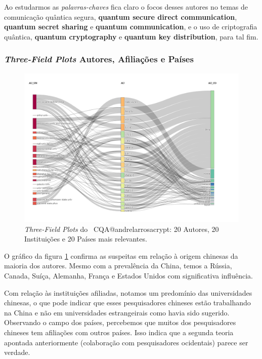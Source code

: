 Ao estudarmos as \textit{palavras-chaves} fica claro o focos desses autores no temas de comunicação quântica segura, \textbf{quantum secure direct communication}, \textbf{quantum secret sharing} e \textbf{quantum communication}, e o uso de criptografia quântica, \textbf{quantum cryptography} e \textbf{quantum key distribution}, para tal fim.


\subsubsection{\textit{Three-Field Plots} Autores, Afiliações e Países}

\begin{figure}
    \centering
    \includegraphics[angle=0,width=1\textwidth]{experiments/andrelarrosacrypt/AnaliseBibliometrica/CriptografiaQuantica/imagens/CQA@andrelarrosacrypt_Aut_Aff_Coun.png}
    \caption{\textit{Three-Field Plots} do \dataset\ CQA@andrelarrosacrypt: 20 Autores, 20 Instituições e 20 Países mais relevantes.}
    \label{CQA@andrelarrosacrypt_Aut_Aff_Coun}
\end{figure}


O gráfico da figura \ref{CQA@andrelarrosacrypt_Aut_Aff_Coun} confirma as suspeitas em relação à origem chinesas da maioria dos autores. Mesmo com a prevalência da China, temos a Rússia, Canada, Suíça, Alemanha, França e Estados Unidos com significativa influência.

Com relação às instituições afiliadas, notamos um predomínio das universidades chinesas, o que pode indicar que esses pesquisadores chineses estão trabalhando na China e não em universidades estrangeirais como havia sido sugerido. Observando o campo dos países, percebemos que muitos dos pesquisadores chineses tem afiliações com outros países. Isso indica que a segunda teoria apontada anteriormente (colaboração com pesquisadores ocidentais) parece ser verdade.


